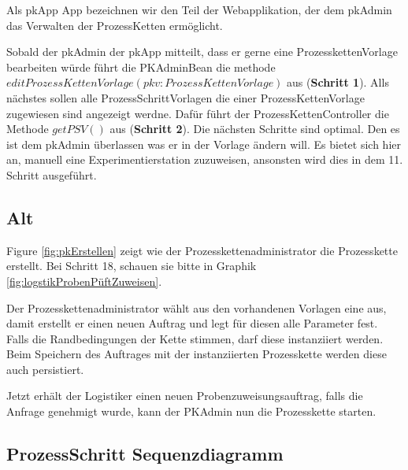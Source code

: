 \documentclass[enabledeprecatedfontcommands,fontsize=12pt,paper=a4,twoside]{scrartcl}
\begin{document}
{Als pkApp  App bezeichnen wir den Teil der Webapplikation, der dem pkAdmin
das Verwalten der ProzessKetten ermöglicht.

Sobald der pkAdmin der pkApp mitteilt, dass er gerne eine ProzesskettenVorlage
bearbeiten würde führt die PKAdminBean die methode
$editProzessKettenVorlage(pkv:ProzessKettenVorlage)$ aus (\textbf{Schritt 1}).
Alls nächstes sollen alle ProzessSchrittVorlagen die einer ProzessKettenVorlage
zugewiesen sind angezeigt werdne. Dafür führt der ProzessKettenController die
Methode $getPSV()$ aus (\textbf{Schritt 2}). Die nächsten Schritte sind optimal.
Den es ist dem pkAdmin überlassen was er in der Vorlage ändern will. Es bietet
sich hier an, manuell eine Experimentierstation zuzuweisen, ansonsten wird dies
in dem 11. Schritt ausgeführt.



\subsection{Alt}
Figure \ref{fig:pkErstellen} zeigt wie der Prozesskettenadministrator die Prozesskette erstellt. 
Bei Schritt 18, schauen sie bitte in Graphik \ref{fig:logstikProbenPüftZuweisen}. 

Der Prozesskettenadministrator wählt aus den vorhandenen Vorlagen eine aus, damit erstellt er einen neuen Auftrag und legt für diesen alle Parameter fest.
Falls die Randbedingungen der Kette stimmen, darf diese instanziiert werden. Beim Speichern des Auftrages mit der instanziierten Prozesskette werden diese auch persistiert.

Jetzt erhält der Logistiker einen neuen Probenzuweisungsauftrag, falls die Anfrage genehmigt wurde, kann der PKAdmin nun die Prozesskette starten.




\subsection{ProzessSchritt Sequenzdiagramm}




}
\end{document}
